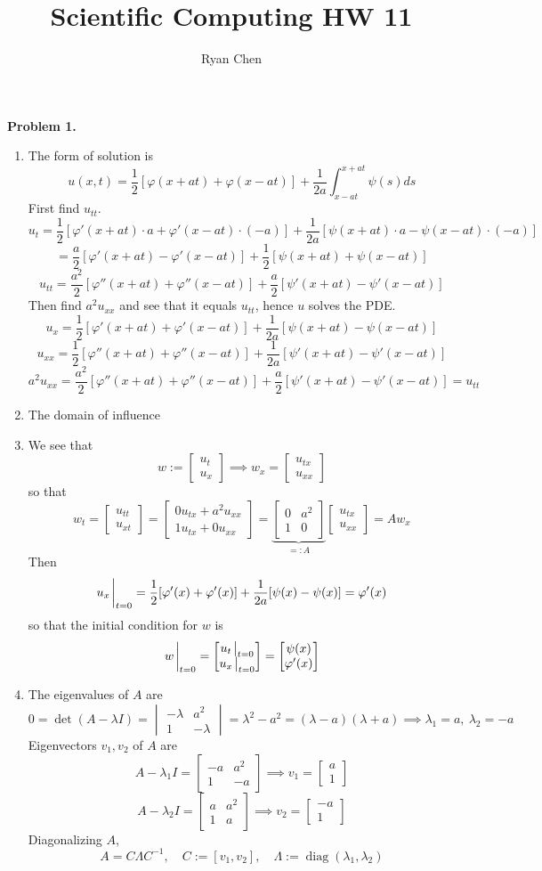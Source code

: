 \documentclass{article}
\title{Scientific Computing HW 11}
\author{Ryan Chen}
\def\tbf#1{\textbf{#1}}
\newcommand{\m}[2][b]{\begin{#1matrix}#2\end{#1matrix}}
\newcommand{\vp}{\varphi}
\newcommand{\inv}{^{-1}}
\newcommand{\imp}{\implies}
\DeclareMathOperator{\diag}{diag}
\begin{document}
	
\maketitle



\tbf{Problem 1.}

\begin{enumerate}[label=(\alph*)]
	
\item The form of solution is
$$u(x,t) = \frac12[\vp(x+at)+\vp(x-at)] + \frac{1}{2a}\int_{x-at}^{x+at}\psi(s)ds$$
First find $u_{tt}$.
$$u_t = \frac12[\vp'(x+at)\cdot a+\vp'(x-at)\cdot(-a)] + \frac{1}{2a}[\psi(x+at)\cdot a-\psi(x-at)\cdot(-a)]$$
$$= \frac{a}{2}[\vp'(x+at)-\vp'(x-at)] + \frac12[\psi(x+at)+\psi(x-at)]$$
$$u_{tt} = \frac{a^2}{2}[\vp''(x+at)+\vp''(x-at)] + \frac a2[\psi'(x+at)-\psi'(x-at)]$$
Then find $a^2u_{xx}$ and see that it equals $u_{tt}$, hence $u$ solves the PDE.
$$u_x = \frac12[\vp'(x+at)+\vp'(x-at)] + \frac{1}{2a}[\psi(x+at)-\psi(x-at)]$$
$$u_{xx} = \frac12[\vp''(x+at)+\vp''(x-at)] + \frac{1}{2a}[\psi'(x+at)-\psi'(x-at)]$$
$$a^2u_{xx} = \frac{a^2}{2}[\vp''(x+at)+\vp''(x-at)] + \frac{a}{2}[\psi'(x+at)-\psi'(x-at)] = u_{tt}$$


\item The domain of influence


\item We see that
$$w := \m{u_t \\ u_x}
\imp w_x = \m{u_{tx} \\ u_{xx}}$$
so that
$$w_t = \m{u_{tt} \\ u_{xt}}
= \m{0u_{tx}+a^2u_{xx} \\ 1u_{tx}+0u_{xx}}
= \underbrace{\m{0 & a^2 \\ 1 & 0}}_{=:A}\m{u_{tx} \\ u_{xx}}
= Aw_x$$
Then
$$u_x\eval_{t=0} = \frac12[\vp'(x)+\vp'(x)] + \frac{1}{2a}[\psi(x)-\psi(x)]
= \vp'(x)$$
so that the initial condition for $w$ is
$$w\eval_{t=0} = \m{u_t\eval_{t=0} \\ u_x\eval_{t=0}}
= \m{\psi(x) \\ \vp'(x)}$$


\item The eigenvalues of $A$ are
$$0 = \det(A-\lambda I)
= \m[v]{-\lambda & a^2 \\ 1 & -\lambda}
= \lambda^2 - a^2
= (\lambda-a)(\lambda+a)
\imp \lambda_1 = a,~\lambda_2 = -a$$
Eigenvectors $v_1,v_2$ of $A$ are
$$A-\lambda_1I = \m{-a & a^2 \\ 1 & -a}
\imp v_1 = \m{a \\ 1}$$
$$A-\lambda_2I = \m{a & a^2 \\ 1 & a}
\imp v_2 = \m{-a \\ 1}$$
Diagonalizing $A$,
$$A = C\Lambda C\inv,
\quad C := [v_1,v_2],
\quad \Lambda := \diag(\lambda_1,\lambda_2)$$


\end{enumerate}
\end{document}
